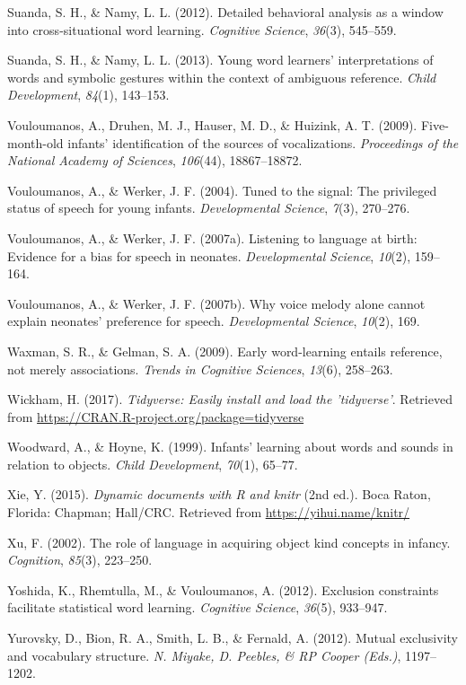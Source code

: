 \documentclass[english,floatsintext,man]{apa6}
\theoremstyle{definition}
\theoremstyle{definition}
\theoremstyle{definition}
\theoremstyle{remark}
\begin{document}
\leavevmode\hypertarget{ref-suanda2012detailed}{}%
Suanda, S. H., \& Namy, L. L. (2012). Detailed behavioral analysis as a
window into cross-situational word learning. \emph{Cognitive Science},
\emph{36}(3), 545--559.

\leavevmode\hypertarget{ref-suanda2013young}{}%
Suanda, S. H., \& Namy, L. L. (2013). Young word learners'
interpretations of words and symbolic gestures within the context of
ambiguous reference. \emph{Child Development}, \emph{84}(1), 143--153.

\leavevmode\hypertarget{ref-vouloumanos2009five}{}%
Vouloumanos, A., Druhen, M. J., Hauser, M. D., \& Huizink, A. T. (2009).
Five-month-old infants' identification of the sources of vocalizations.
\emph{Proceedings of the National Academy of Sciences}, \emph{106}(44),
18867--18872.

\leavevmode\hypertarget{ref-vouloumanos2004tuned}{}%
Vouloumanos, A., \& Werker, J. F. (2004). Tuned to the signal: The
privileged status of speech for young infants. \emph{Developmental
Science}, \emph{7}(3), 270--276.

\leavevmode\hypertarget{ref-vouloumanos2007listening}{}%
Vouloumanos, A., \& Werker, J. F. (2007a). Listening to language at
birth: Evidence for a bias for speech in neonates. \emph{Developmental
Science}, \emph{10}(2), 159--164.

\leavevmode\hypertarget{ref-vouloumanos2007voice}{}%
Vouloumanos, A., \& Werker, J. F. (2007b). Why voice melody alone cannot
explain neonates' preference for speech. \emph{Developmental Science},
\emph{10}(2), 169.

\leavevmode\hypertarget{ref-waxman2009early}{}%
Waxman, S. R., \& Gelman, S. A. (2009). Early word-learning entails
reference, not merely associations. \emph{Trends in Cognitive Sciences},
\emph{13}(6), 258--263.

\leavevmode\hypertarget{ref-R-tidyverse}{}%
Wickham, H. (2017). \emph{Tidyverse: Easily install and load the
'tidyverse'}. Retrieved from
\url{https://CRAN.R-project.org/package=tidyverse}

\leavevmode\hypertarget{ref-woodward1999infants}{}%
Woodward, A., \& Hoyne, K. (1999). Infants' learning about words and
sounds in relation to objects. \emph{Child Development}, \emph{70}(1),
65--77.

\leavevmode\hypertarget{ref-R-knitr}{}%
Xie, Y. (2015). \emph{Dynamic documents with R and knitr} (2nd ed.).
Boca Raton, Florida: Chapman; Hall/CRC. Retrieved from
\url{https://yihui.name/knitr/}

\leavevmode\hypertarget{ref-xu2002role}{}%
Xu, F. (2002). The role of language in acquiring object kind concepts in
infancy. \emph{Cognition}, \emph{85}(3), 223--250.

\leavevmode\hypertarget{ref-yoshida2012exclusion}{}%
Yoshida, K., Rhemtulla, M., \& Vouloumanos, A. (2012). Exclusion
constraints facilitate statistical word learning. \emph{Cognitive
Science}, \emph{36}(5), 933--947.

\leavevmode\hypertarget{ref-yurovsky2012mutual}{}%
Yurovsky, D., Bion, R. A., Smith, L. B., \& Fernald, A. (2012). Mutual
exclusivity and vocabulary structure. \emph{N. Miyake, D. Peebles, \& RP
Cooper (Eds.)}, 1197--1202.
\end{document}
